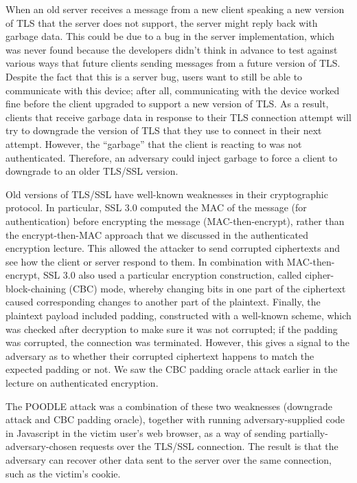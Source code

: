 \documentclass[
  letterpaper,
]{scrbook}
\theoremstyle{definition}
\theoremstyle{plain}
\theoremstyle{plain}
\theoremstyle{remark}
\begin{document}
When an old server receives a message from a new client speaking a new
version of TLS that the server does not support, the server might reply
back with garbage data. This could be due to a bug in the server
implementation, which was never found because the developers didn't
think in advance to test against various ways that future clients
sending messages from a future version of TLS. Despite the fact that
this is a server bug, users want to still be able to communicate with
this device; after all, communicating with the device worked fine before
the client upgraded to support a new version of TLS. As a result,
clients that receive garbage data in response to their TLS connection
attempt will try to downgrade the version of TLS that they use to
connect in their next attempt. However, the ``garbage'' that the client
is reacting to was not authenticated. Therefore, an adversary could
inject garbage to force a client to downgrade to an older TLS/SSL
version.

Old versions of TLS/SSL have well-known weaknesses in their
cryptographic protocol. In particular, SSL 3.0 computed the MAC of the
message (for authentication) before encrypting the message
(MAC-then-encrypt), rather than the encrypt-then-MAC approach that we
discussed in the authenticated encryption lecture. This allowed the
attacker to send corrupted ciphertexts and see how the client or server
respond to them. In combination with MAC-then-encrypt, SSL 3.0 also used
a particular encryption construction, called cipher-block-chaining (CBC)
mode, whereby changing bits in one part of the ciphertext caused
corresponding changes to another part of the plaintext. Finally, the
plaintext payload included padding, constructed with a well-known
scheme, which was checked after decryption to make sure it was not
corrupted; if the padding was corrupted, the connection was terminated.
However, this gives a signal to the adversary as to whether their
corrupted ciphertext happens to match the expected padding or not. We
saw the CBC padding oracle attack earlier in the lecture on
authenticated encryption.

The POODLE attack was a combination of these two weaknesses (downgrade
attack and CBC padding oracle), together with running adversary-supplied
code in Javascript in the victim user's web browser, as a way of sending
partially-adversary-chosen requests over the TLS/SSL connection. The
result is that the adversary can recover other data sent to the server
over the same connection, such as the victim's cookie.
\end{document}
